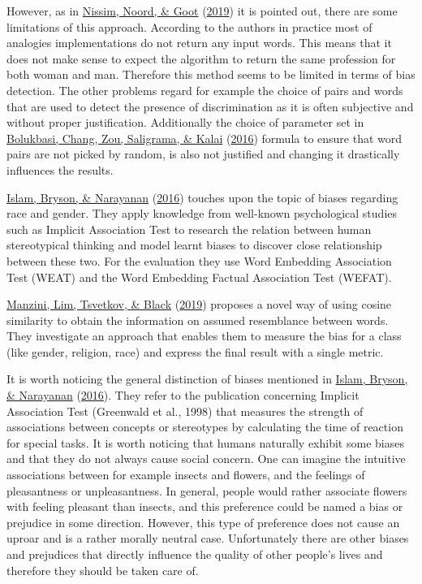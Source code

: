 \documentclass[
  12pt,
]{book}
\begin{document}
However, as in \protect\hyperlink{ref-Nissim2019Fair}{Nissim, Noord, \& Goot} (\protect\hyperlink{ref-Nissim2019Fair}{2019}) it is pointed out, there are some limitations of this approach. According to the authors in practice most of analogies implementations do not return any input words. This means that it does not make sense to expect the algorithm to return the same profession for both woman and man. Therefore this method seems to be limited in terms of bias detection. The other problems regard for example the
choice of pairs and words that are used to detect the presence of discrimination as it is often subjective and without proper justification. Additionally the choice of parameter set in \protect\hyperlink{ref-Bolukbasi2016Man}{Bolukbasi, Chang, Zou, Saligrama, \& Kalai} (\protect\hyperlink{ref-Bolukbasi2016Man}{2016}) formula to ensure that word pairs are not picked by random, is also not justified and changing it drastically
influences the results.

\protect\hyperlink{ref-Caliskan2017Semantics}{Islam, Bryson, \& Narayanan} (\protect\hyperlink{ref-Caliskan2017Semantics}{2016}) touches upon the topic of biases regarding race and gender. They apply knowledge from well-known psychological studies such as Implicit Association Test to research the relation between human stereotypical thinking and model learnt biases to
discover close relationship between these two. For the evaluation they use Word Embedding Association Test (WEAT) and the Word Embedding Factual Association Test (WEFAT).

\protect\hyperlink{ref-manzini2019black}{Manzini, Lim, Tsvetkov, \& Black} (\protect\hyperlink{ref-manzini2019black}{2019}) proposes a novel way of using cosine similarity to obtain the information on assumed resemblance between words. They investigate
an approach that enables them to measure the bias for a class (like gender, religion, race) and express the final result with a single metric.

It is worth noticing the general distinction of biases mentioned in \protect\hyperlink{ref-Caliskan2017Semantics}{Islam, Bryson, \& Narayanan} (\protect\hyperlink{ref-Caliskan2017Semantics}{2016}). They refer to the publication concerning Implicit Association Test (Greenwald et al., 1998) that measures the strength of associations between concepts or stereotypes by calculating the time of reaction for special tasks. It is worth noticing that humans naturally exhibit some biases and that they do not always cause social concern. One can imagine the intuitive associations between for example insects and flowers, and the feelings of pleasantness or unpleasantness. In general, people would rather associate flowers with feeling pleasant than insects, and this preference could be named a bias or
prejudice in some direction. However, this type of preference does not cause an uproar and is a rather morally neutral case. Unfortunately there are other
biases and prejudices that directly influence the quality of other people's lives and therefore they should be taken care of.
\end{document}
